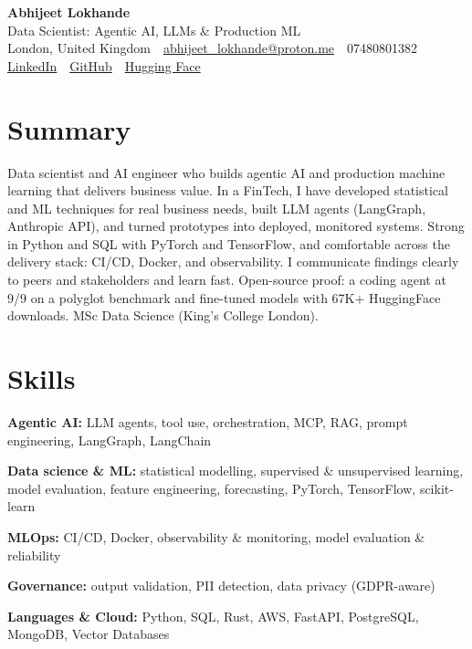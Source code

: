 \documentclass[10pt,a4paper]{article}
\newcommand{\sep}{\,\textcolor{accent!60}{\textbar}\,}
\begin{document}
\begin{center}
  {\fontsize{24}{26}\selectfont\bfseries Abhijeet Lokhande}\\[3pt]
  {\color{accent}\large Data Scientist: Agentic AI, LLMs \& Production ML}\\[5pt]
  {\small
    London, United Kingdom \sep
    \href{mailto:abhijeet_lokhande@proton.me}{abhijeet\_lokhande@proton.me} \sep
    07480801382 \\[2pt]
    \href{https://www.linkedin.com/in/ablds/}{LinkedIn} \sep
    \href{https://github.com/abhijeetscode}{GitHub} \sep
    \href{https://huggingface.co/ab-ai}{Hugging Face}
  }
\end{center}
\vspace{2pt}

\section{Summary}
Data scientist and AI engineer who builds agentic AI and production machine learning that delivers business value. In a FinTech, I have developed statistical and ML techniques for real business needs, built LLM agents (LangGraph, Anthropic API), and turned prototypes into deployed, monitored systems. Strong in Python and SQL with PyTorch and TensorFlow, and comfortable across the delivery stack: CI/CD, Docker, and observability. I communicate findings clearly to peers and stakeholders and learn fast. Open-source proof: a coding agent at 9/9 on a polyglot benchmark and fine-tuned models with 67K+ HuggingFace downloads. MSc Data Science (King's College London).

\section{Skills}
\begin{tight}
  \item[\textcolor{accent}{\small$\bullet$}] \textbf{Agentic AI:} LLM agents, tool use, orchestration, MCP, RAG, prompt engineering, LangGraph, LangChain
  \item[\textcolor{accent}{\small$\bullet$}] \textbf{Data science \& ML:} statistical modelling, supervised \& unsupervised learning, model evaluation, feature engineering, forecasting, PyTorch, TensorFlow, scikit-learn
  \item[\textcolor{accent}{\small$\bullet$}] \textbf{MLOps:} CI/CD, Docker, observability \& monitoring, model evaluation \& reliability
  \item[\textcolor{accent}{\small$\bullet$}] \textbf{Governance:} output validation, PII detection, data privacy (GDPR-aware)
  \item[\textcolor{accent}{\small$\bullet$}] \textbf{Languages \& Cloud:} Python, SQL, Rust, AWS, FastAPI, PostgreSQL, MongoDB, Vector Databases
\end{tight}
\end{document}
